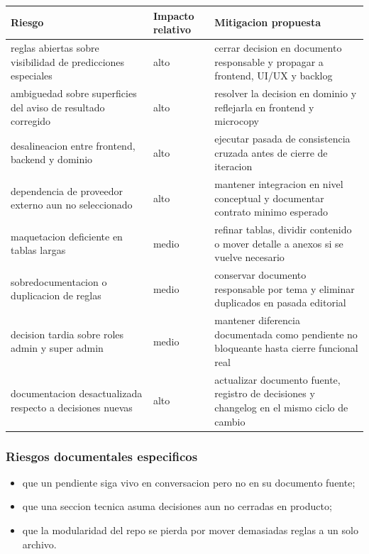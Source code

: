 \begin{longtable}{p{}p{}p{}}
\toprule
\textbf{Riesgo} & \textbf{Impacto relativo} & \textbf{Mitigacion propuesta} \\
\midrule
reglas abiertas sobre visibilidad de predicciones especiales & alto & cerrar decision en documento responsable y propagar a frontend, UI/UX y backlog \\
ambiguedad sobre superficies del aviso de resultado corregido & alto & resolver la decision en dominio y reflejarla en frontend y microcopy \\
desalineacion entre frontend, backend y dominio & alto & ejecutar pasada de consistencia cruzada antes de cierre de iteracion \\
dependencia de proveedor externo aun no seleccionado & alto & mantener integracion en nivel conceptual y documentar contrato minimo esperado \\
maquetacion deficiente en tablas largas & medio & refinar tablas, dividir contenido o mover detalle a anexos si se vuelve necesario \\
sobredocumentacion o duplicacion de reglas & medio & conservar documento responsable por tema y eliminar duplicados en pasada editorial \\
decision tardia sobre roles admin y super admin & medio & mantener diferencia documentada como pendiente no bloqueante hasta cierre funcional real \\
documentacion desactualizada respecto a decisiones nuevas & alto & actualizar documento fuente, registro de decisiones y changelog en el mismo ciclo de cambio \\
\bottomrule
\end{longtable}

\subsubsection{Riesgos documentales especificos}

\begin{itemize}
  \item que un pendiente siga vivo en conversacion pero no en su documento fuente;
  \item que una seccion tecnica asuma decisiones aun no cerradas en producto;
  \item que la modularidad del repo se pierda por mover demasiadas reglas a un solo archivo.
\end{itemize}

